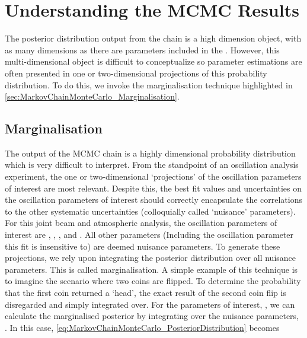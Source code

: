 \section{Understanding the MCMC Results}
\label{sec:MarkovChainMonteCarlo_UnderstandingMCMCResults}

  The posterior distribution output from the chain is a high dimension object, with as many dimensions as there are parameters included in the  . However, this multi-dimensional object is difficult to conceptualize so parameter estimations are often presented in one or two-dimensional projections of this probability distribution. To do this, we invoke the marginalisation technique highlighted in \autoref{sec:MarkovChainMonteCarlo_Marginalisation}.

\subsection{Marginalisation}
\label{sec:MarkovChainMonteCarlo_Marginalisation}

The output of the MCMC chain is a highly dimensional probability distribution which is very difficult to interpret. From the standpoint of an oscillation analysis experiment, the one or two-dimensional `projections' of the oscillation parameters of interest are most relevant. Despite this, the best fit values and uncertainties on the oscillation parameters of interest should correctly encapsulate the correlations to the other systematic uncertainties (colloquially called `nuisance' parameters). For this joint beam and atmospheric analysis, the oscillation parameters of interest are \sinsqatm, \sinsqreac, \delmsqatm, and \dcp. All other parameters (Including the oscillation parameter this fit is insensitive to) are deemed nuisance parameters. To generate these projections, we rely upon integrating the posterior distribution over all nuisance parameters. This is called marginalisation. A simple example of this technique is to imagine the scenario where two coins are flipped. To determine the probability that the first coin returned a `head', the exact result of the second coin flip is disregarded and simply integrated over. For the parameters of interest, , we can calculate the marginalised posterior by integrating over the nuisance parameters, . In this case, \autoref{eq:MarkovChainMonteCarlo_PosteriorDistribution} becomes

